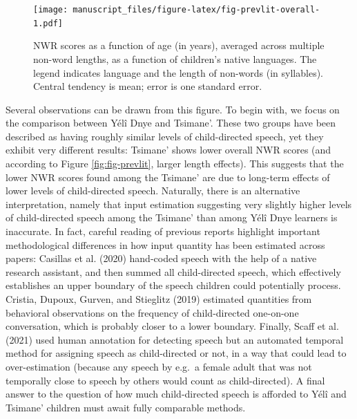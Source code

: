 \documentclass[english,,man,floatsintext]{apa6}
\begin{document}
\begin{figure}
\centering
\texttt{[image: manuscript\_files/figure-latex/fig-prevlit-overall-1.pdf]}
\caption{\label{fig:fig-prevlit-overall}NWR scores as a function of age (in years), averaged across multiple non-word lengths, as a function of children's native languages. The legend indicates language and the length of non-words (in syllables). Central tendency is mean; error is one standard error.}
\end{figure}

Several observations can be drawn from this figure. To begin with, we focus on the comparison between Yélî Dnye and Tsimane'. These two groups have been described as having roughly similar levels of child-directed speech, yet they exhibit very different results: Tsimane' shows lower overall NWR scores (and according to Figure \ref{fig:fig-prevlit}, larger length effects). This suggests that the lower NWR scores found among the Tsimane' are due to long-term effects of lower levels of child-directed speech. Naturally, there is an alternative interpretation, namely that input estimation suggesting very slightly higher levels of child-directed speech among the Tsimane' than among Yélî Dnye learners is inaccurate. In fact, careful reading of previous reports highlight important methodological differences in how input quantity has been estimated across papers: Casillas et al. (2020) hand-coded speech with the help of a native research assistant, and then summed all child-directed speech, which effectively establishes an upper boundary of the speech children could potentially process. Cristia, Dupoux, Gurven, and Stieglitz (2019) estimated quantities from behavioral observations on the frequency of child-directed one-on-one conversation, which is probably closer to a lower boundary. Finally, Scaff et al. (2021) used human annotation for detecting speech but an automated temporal method for assigning speech as child-directed or not, in a way that could lead to over-estimation (because any speech by e.g.~a female adult that was not temporally close to speech by others would count as child-directed). A final answer to the question of how much child-directed speech is afforded to Yélî and Tsimane' children must await fully comparable methods.
\end{document}
